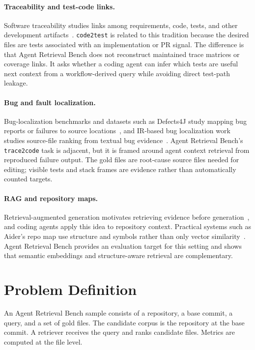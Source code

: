 \documentclass[11pt]{article}
\newcommand{\arb}{Agent Retrieval Bench}
\newcommand{\code}[1]{\texttt{#1}}
\begin{document}
\paragraph{Traceability and test-code links.}
Software traceability studies links among requirements, code, tests, and other development artifacts~\citep{gotel2012traceability}. \code{code2test} is related to this tradition because the desired files are tests associated with an implementation or PR signal. The difference is that \arb{} does not reconstruct maintained trace matrices or coverage links. It asks whether a coding agent can infer which tests are useful next context from a workflow-derived query while avoiding direct test-path leakage.

\paragraph{Bug and fault localization.}
Bug-localization benchmarks and datasets such as Defects4J study mapping bug reports or failures to source locations~\citep{just2014defects4j}, and IR-based bug localization work studies source-file ranking from textual bug evidence~\citep{akbar2020irbuglocalization}. \arb{}'s \code{trace2code} task is adjacent, but it is framed around agent context retrieval from reproduced failure output. The gold files are root-cause source files needed for editing; visible tests and stack frames are evidence rather than automatically counted targets.

\paragraph{RAG and repository maps.}
Retrieval-augmented generation motivates retrieving evidence before generation~\citep{lewis2020rag}, and coding agents apply this idea to repository context. Practical systems such as Aider's repo map use structure and symbols rather than only vector similarity~\citep{aiderrepomap}. \arb{} provides an evaluation target for this setting and shows that semantic embeddings and structure-aware retrieval are complementary.

\section{Problem Definition}

An \arb{} sample consists of a repository, a base commit, a query, and a set of gold files. The candidate corpus is the repository at the base commit. A retriever receives the query and ranks candidate files. Metrics are computed at the file level.
\end{document}
